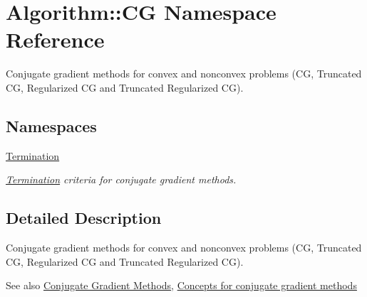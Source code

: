 \hypertarget{namespaceAlgorithm_1_1CG}{}\section{Algorithm\+:\+:C\+G Namespace Reference}
\label{namespaceAlgorithm_1_1CG}


Conjugate gradient methods for convex and nonconvex problems (C\+G, Truncated C\+G, Regularized C\+G and Truncated Regularized C\+G).  


\subsection*{Namespaces}
\begin{DoxyCompactItemize}
\item 
 \hyperlink{namespaceAlgorithm_1_1CG_1_1Termination}{Termination}
\begin{DoxyCompactList}\small\item\em \hyperlink{namespaceAlgorithm_1_1CG_1_1Termination}{Termination} criteria for conjugate gradient methods. \end{DoxyCompactList}\end{DoxyCompactItemize}


\subsection{Detailed Description}
Conjugate gradient methods for convex and nonconvex problems (C\+G, Truncated C\+G, Regularized C\+G and Truncated Regularized C\+G). 

\begin{DoxySeeAlso}{See also}
\hyperlink{group__CGGroup}{Conjugate Gradient Methods}, \hyperlink{group__CGConceptGroup}{Concepts for conjugate gradient methods} 
\end{DoxySeeAlso}
